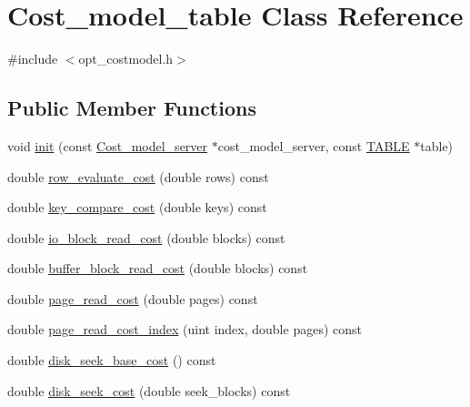 \hypertarget{classCost__model__table}{}\section{Cost\+\_\+model\+\_\+table Class Reference}
\label{classCost__model__table}


{\ttfamily \#include $<$opt\+\_\+costmodel.\+h$>$}

\subsection*{Public Member Functions}
\begin{DoxyCompactItemize}
\item 
void \mbox{\hyperlink{classCost__model__table_aa7d9b80473b08cb55eb5b87c788f0274}{init}} (const \mbox{\hyperlink{classCost__model__server}{Cost\+\_\+model\+\_\+server}} $\ast$cost\+\_\+model\+\_\+server, const \mbox{\hyperlink{structTABLE}{T\+A\+B\+LE}} $\ast$table)
\item 
double \mbox{\hyperlink{classCost__model__table_a9c4bdc53d6fe77c76fa2c3e7acbb9b0c}{row\+\_\+evaluate\+\_\+cost}} (double rows) const
\item 
double \mbox{\hyperlink{classCost__model__table_af442546c88953a32e25f05a36dfa4e76}{key\+\_\+compare\+\_\+cost}} (double keys) const
\item 
double \mbox{\hyperlink{classCost__model__table_a334815cfa999a4d55461aec523630a6a}{io\+\_\+block\+\_\+read\+\_\+cost}} (double blocks) const
\item 
double \mbox{\hyperlink{classCost__model__table_a3d409ece408a16a38f8ebdb6f713c59a}{buffer\+\_\+block\+\_\+read\+\_\+cost}} (double blocks) const
\item 
double \mbox{\hyperlink{classCost__model__table_a4105484634b87ab3736f5bfa41d8fb4d}{page\+\_\+read\+\_\+cost}} (double pages) const
\item 
double \mbox{\hyperlink{classCost__model__table_a4732927c2aaa990219b7abeeb98f55aa}{page\+\_\+read\+\_\+cost\+\_\+index}} (uint index, double pages) const
\item 
double \mbox{\hyperlink{classCost__model__table_a5a45ab14ac40b5560c22acb0d25f7f01}{disk\+\_\+seek\+\_\+base\+\_\+cost}} () const
\item 
double \mbox{\hyperlink{classCost__model__table_ad36900f273faa51228c6bf1f7fb3c3d6}{disk\+\_\+seek\+\_\+cost}} (double seek\+\_\+blocks) const
\end{DoxyCompactItemize}
